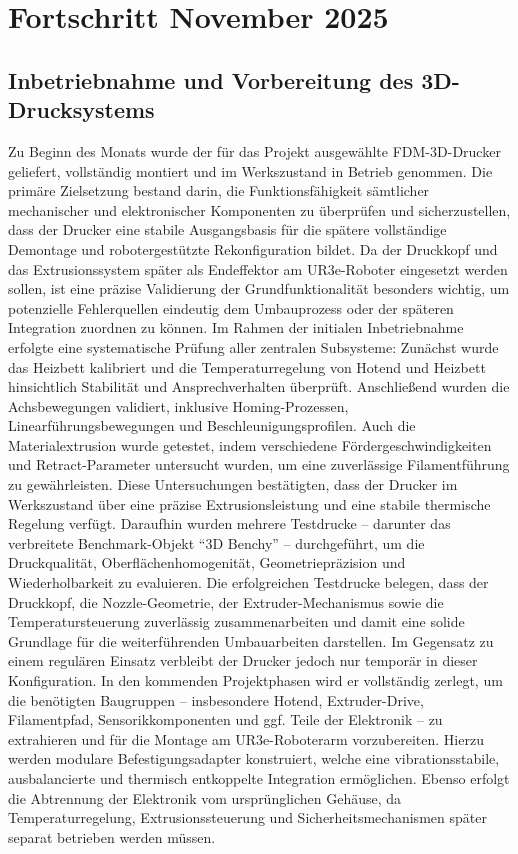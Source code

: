 \documentclass[
	paper=a4,
	fontsize=11pt,
	parskip=half,
	headings=normal,
	bibliography=totoc,
	listof=totoc
]{scrartcl}
\begin{document}
\section{Fortschritt November 2025}
\subsection{Inbetriebnahme und Vorbereitung des 3D-Drucksystems}
Zu Beginn des Monats wurde der für das Projekt ausgewählte FDM-3D-Drucker geliefert, vollständig montiert und im Werkszustand in Betrieb genommen.
Die primäre Zielsetzung bestand darin, die Funktionsfähigkeit sämtlicher mechanischer und elektronischer Komponenten zu überprüfen und sicherzustellen, dass der Drucker eine stabile Ausgangsbasis für die spätere vollständige Demontage und robotergestützte Rekonfiguration bildet.
Da der Druckkopf und das Extrusionssystem später als Endeffektor am UR3e-Roboter eingesetzt werden sollen, ist eine präzise Validierung der Grundfunktionalität besonders wichtig, um potenzielle Fehlerquellen eindeutig dem Umbauprozess oder der späteren Integration zuordnen zu können.
Im Rahmen der initialen Inbetriebnahme erfolgte eine systematische Prüfung aller zentralen Subsysteme: Zunächst wurde das Heizbett kalibriert und die Temperaturregelung von Hotend und Heizbett hinsichtlich Stabilität und Ansprechverhalten überprüft.
Anschließend wurden die Achsbewegungen validiert, inklusive Homing-Prozessen, Linearführungsbewegungen und Beschleunigungsprofilen.
Auch die Materialextrusion wurde getestet, indem verschiedene Fördergeschwindigkeiten und Retract-Parameter untersucht wurden, um eine zuverlässige Filamentführung zu gewährleisten.
Diese Untersuchungen bestätigten, dass der Drucker im Werkszustand über eine präzise Extrusionsleistung und eine stabile thermische Regelung verfügt.
Daraufhin wurden mehrere Testdrucke -- darunter das verbreitete Benchmark-Objekt \enquote{3D Benchy} -- durchgeführt, um die Druckqualität, Oberflächenhomogenität, Geometriepräzision und Wiederholbarkeit zu evaluieren.
Die erfolgreichen Testdrucke belegen, dass der Druckkopf, die Nozzle-Geometrie, der Extruder-Mechanismus sowie die Temperatursteuerung zuverlässig zusammenarbeiten und damit eine solide Grundlage für die weiterführenden Umbauarbeiten darstellen.
Im Gegensatz zu einem regulären Einsatz verbleibt der Drucker jedoch nur temporär in dieser Konfiguration.
In den kommenden Projektphasen wird er vollständig zerlegt, um die benötigten Baugruppen -- insbesondere Hotend, Extruder-Drive, Filamentpfad, Sensorikkomponenten und ggf. Teile der Elektronik -- zu extrahieren und für die Montage am UR3e-Roboterarm vorzubereiten.
Hierzu werden modulare Befestigungsadapter konstruiert, welche eine vibrationsstabile, ausbalancierte und thermisch entkoppelte Integration ermöglichen.
Ebenso erfolgt die Abtrennung der Elektronik vom ursprünglichen Gehäuse, da Temperaturregelung, Extrusionssteuerung und Sicherheitsmechanismen später separat betrieben werden müssen.
\end{document}
